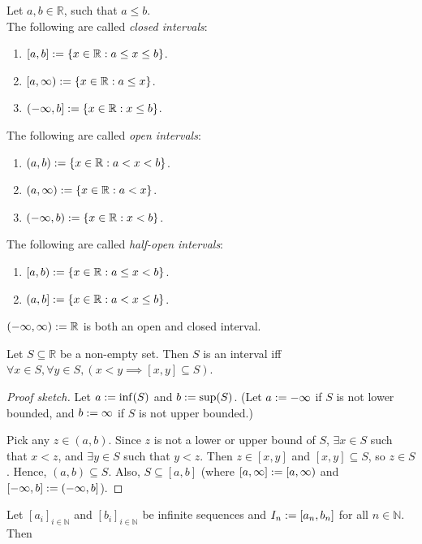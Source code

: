 \documentclass[a4paper, 12pt, fleqn]{article}
\begin{document}
\begin{definition}[Interval]
Let $a, b \in \mathbb{R}$, such that $a \le b$.
\\ The following are called \emph{closed intervals}:
\begin{enumerate}
\item $[a, b] := \{x \in \mathbb{R}: a \le x \le b\}$.
\item $[a, \infty) := \{x \in \mathbb{R}: a \le x\}$.
\item $(-\infty, b] := \{x \in \mathbb{R}: x \le b\}$.
\end{enumerate}
The following are called \emph{open intervals}:
\begin{enumerate}
\item $(a, b) := \{x \in \mathbb{R}: a < x < b\}$.
\item $(a, \infty) := \{x \in \mathbb{R}: a < x\}$.
\item $(-\infty, b) := \{x \in \mathbb{R}: x < b\}$.
\end{enumerate}
The following are called \emph{half-open intervals}:
\begin{enumerate}
\item $[a, b) := \{x \in \mathbb{R}: a \le x < b\}$.
\item $(a, b] := \{x \in \mathbb{R}: a < x \le b\}$.
\end{enumerate}
$(-\infty, \infty) := \mathbb{R}$ is both an open and closed interval.
\end{definition}

\begin{lemma}
Let $S \subseteq \mathbb{R}$ be a non-empty set.
Then $S$ is an interval iff $\forall x \in S, \forall y \in S, (x < y \implies [x, y] \subseteq S)$.
\end{lemma}
\begin{proof}[Proof sketch]
Let $a := \inf(S)$ and $b := \sup(S)$.
(Let $a := -\infty$ if $S$ is not lower bounded,
and $b := \infty$ if $S$ is not upper bounded.)

Pick any $z \in (a, b)$. Since $z$ is not a lower or upper bound of $S$,
$\exists x \in S$ such that $x < z$, and $\exists y \in S$ such that $y < z$.
Then $z \in [x, y]$ and $[x, y] \subseteq S$, so $z \in S$. Hence, $(a, b) \subseteq S$.
Also, $S \subseteq [a, b]$ (where $[a, \infty] := [a, \infty)$ and $[-\infty, b] := (-\infty, b]$).
\end{proof}

\begin{lemma}
Let $[a_i]_{i \in \mathbb{N}}$ and $[b_i]_{i \in \mathbb{N}}$ be infinite sequences
and $I_n := [a_n, b_n]$ for all $n \in \mathbb{N}$. Then
\end{lemma}
\end{document}
